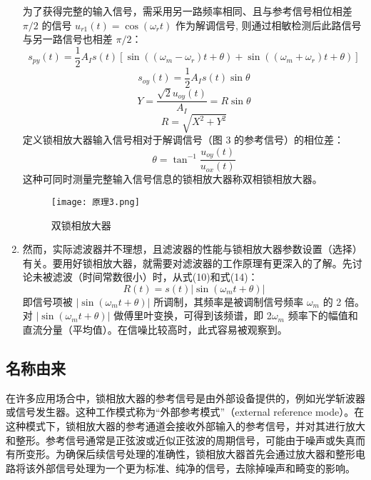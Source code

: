 \documentclass[dvipsnames, svgnames,a4paper,11pt]{article}
\begin{document}
\begin{enumerate}
    为了获得完整的输入信号，需采用另一路频率相同、且与参考信号相位相差 \(\pi/2\) 的信号 \(u_{r1}(t) = \cos (\omega_r t)\) 作为解调信号, 则通过相敏检测后此路信号与另一路信号也相差 \(\pi/2\)：
    \begin{equation}
        s_{py}(t) = \frac{1}{2} A_I s(t) \left[\sin ((\omega_m - \omega_r) t + \theta) + \sin ((\omega_m + \omega_r) t + \theta)\right]
    \end{equation}
    \begin{equation}
        s_{oy}(t) = \frac{1}{2} A_I s(t) \sin \theta
    \end{equation}
    \[
        Y = \frac{\sqrt{2} u_{oy}(t)}{A_I} = R \sin \theta
    \]
    \begin{equation}
        R = \sqrt{X^2 + Y^2}
    \end{equation}
    定义锁相放大器输入信号相对于解调信号（图 3 的参考信号）的相位差：
    \begin{equation}
        \theta = \tan^{-1} \frac{u_{oy}(t)}{u_{ox}(t)}
    \end{equation}
    这种可同时测量完整输入信号信息的锁相放大器称双相锁相放大器。
\begin{figure}[{H}]
	\centering
	\texttt{[image: 原理3.png]}
	\caption{双锁相放大器}
	\label{}
\end{figure}
    \item 然而，实际滤波器并不理想，且滤波器的性能与锁相放大器参数设置（选择）有关。要用好锁相放大器，就需要对滤波器的工作原理有更深入的了解。先讨论未被滤波（时间常数很小）时，从式(10)和式(14)：
    \begin{equation}
        R(t) = s(t) |\sin (\omega_m t + \theta)|
    \end{equation}
    即信号项被 \(|\sin (\omega_m t + \theta)|\) 所调制，其频率是被调制信号频率 \(\omega_m\) 的 2 倍。对 \(|\sin (\omega_m t + \theta)|\) 做傅里叶变换，可得到该频谱，即 2\(\omega_m\) 频率下的幅值和直流分量（平均值）。在信噪比较高时，此式容易被观察到。
\end{enumerate}
\subsection{名称由来}

在许多应用场合中，锁相放大器的参考信号是由外部设备提供的，例如光学斩波器或信号发生器。这种工作模式称为“外部参考模式”（external reference mode）。在这种模式下，锁相放大器的参考通道会接收外部输入的参考信号，并对其进行放大和整形。参考信号通常是正弦波或近似正弦波的周期信号，可能由于噪声或失真而有所变形。为确保后续信号处理的准确性，锁相放大器首先会通过放大器和整形电路将该外部信号处理为一个更为标准、纯净的信号，去除掉噪声和畸变的影响。
\end{document}
